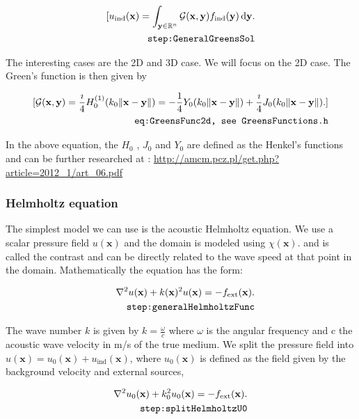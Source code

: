 \documentclass[10pt,a4paper]{article}
\newcommand{\df}[1]{\, \ensuremath{\mbox{d}#1}}
\begin{document}
\begin{align} \label{eq:GeneralGreensSol}
[ u_\text{ind}(\mathbf{x}) =
\int_{\mathbf{y} \in \mathbb{R}^n} \mathcal{G}(\mathbf{x}, \mathbf{y})
f_\text{ind}(\mathbf{y}) \df{\mathbf{y}}.\\
\tag*{\texttt{step:GeneralGreensSol}}
\end{align}

The interesting cases are the 2D and 3D case. We will focus on the 2D case. The Green's function is then
given by

\begin{align} \label{eq:GreensFunc2d}[ \mathcal{G}(\mathbf{x}, \mathbf{y}) =
\frac{\imath}{4} H_0^{(1)}(k_0 \|\mathbf{x} - \mathbf{y}\|) =
-\frac{1}{4} Y_0(k_0 \|\mathbf{x} - \mathbf{y}\|) + \frac{\imath}{4}
J_0(k_0 \|\mathbf{x} - \mathbf{y}\|).  ]\\
\tag*{\texttt{eq:GreensFunc2d, see GreensFunctions.h}}
\end{align}

In the above equation, the $H_0$ , $J_0$ and $Y_0$ are defined as the
Henkel's functions and can be further researched at :
\url{http://amcm.pcz.pl/get.php?article=2012_1/art_06.pdf}

\subsubsection{Helmholtz equation}
The simplest model we can use is the acoustic Helmholtz equation. We
use a scalar pressure field $u(\mathbf{x})$ and the domain is modeled
using $\chi(\mathbf{x})$. and is called the contrast and can be
directly related to the wave speed at that point in the domain.
Mathematically the equation has the form:

\begin{align} \label{eq:generalHelmholtzFunc}
\nabla^2 u(\mathbf{x}) + k(\mathbf{x})^2 u(\mathbf{x}) =
-f_{\text{ext}}(\mathbf{x}).\\
\tag*{\texttt{step:generalHelmholtzFunc}}
\end{align}

The wave number $k$ is given by $k = \frac{\omega}{c}$ where $\omega$
is the angular frequency and c the
acoustic wave velocity in m/s of the true medium.
We split the pressure field into $u(\mathbf{x}) = u_0(\mathbf{x}) +
u_{\text{ind}}(\mathbf{x})$, where $u_0(\mathbf{x})$ is defined as the
field given by the background velocity and external sources,

\begin{align} \label{eq:splitHelmholtzU0}
\nabla^2 u_0(\mathbf{x}) + k_0^2 u_0(\mathbf{x}) = -f_{\text{ext}}(\mathbf{x}).\\
\tag*{\texttt{step:splitHelmholtzU0}}
\end{align}
\end{document}
